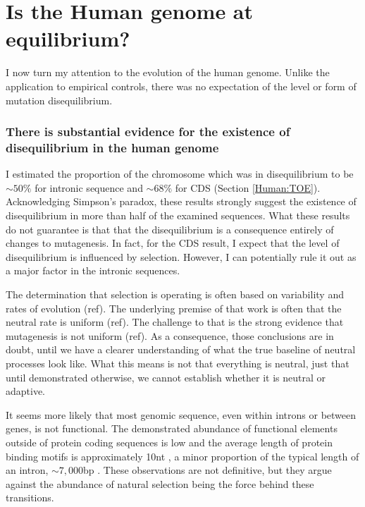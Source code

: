 \section{Is the Human genome at equilibrium?}

I now turn my attention to the evolution of the human genome. Unlike the application to empirical controls, there was no expectation of the level or form of mutation disequilibrium. 

\subsubsection{There is substantial evidence for the existence of disequilibrium in the human genome}

I estimated the proportion of the chromosome which was in disequilibrium to be $\sim50\%$ for intronic sequence and $\sim68\%$ for CDS (Section \ref{Human:TOE}). Acknowledging Simpson's paradox, these results strongly suggest the existence of disequilibrium in more than half of the examined sequences. What these results do not guarantee is that that the disequilibrium is a consequence entirely of changes to mutagenesis. In fact, for the CDS result, I expect that the level of disequilibrium is influenced by selection. However, I can potentially rule it out as a major factor in the intronic sequences. 

The determination that selection is operating is often based on variability and rates of evolution (ref). The underlying premise of that work is often that the neutral rate is uniform (ref). The challenge to that is the strong evidence that mutagenesis is not uniform (ref). As a consequence, those conclusions are in doubt, until we have a clearer understanding of what the true baseline of neutral processes look like. What this means is not that everything is neutral, just that until demonstrated otherwise, we cannot establish whether it is neutral or adaptive. 

It seems more likely that most genomic sequence, even within introns or between genes, is not functional. The demonstrated abundance of functional elements outside of protein coding sequences is low \citep{Graur2013OnENCODE} and the average length of protein binding motifs is approximately 10nt \citep{Stewart2012WhyLong}, a minor proportion of the typical length of an intron, $\sim7,000$bp \citep{10.1093/database/baw153}. These observations are not definitive, but they argue against the abundance of natural selection being the force behind these transitions. 

